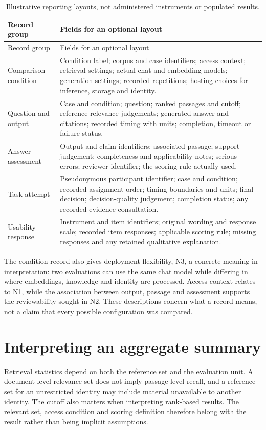 \begin{longtable}{@{}>{\raggedright\arraybackslash}p{}>{\raggedright\arraybackslash}p{}@{}}
\caption{Illustrative reporting layouts, not administered instruments or populated results.}\label{tab:optional-record-layouts}\\
\toprule
Record group & Fields for an optional layout \\
\midrule
\endfirsthead
\toprule
Record group & Fields for an optional layout \\
\midrule
\endhead
Comparison condition & Condition label; corpus and case identifiers; access context; retrieval settings; actual chat and embedding models; generation settings; recorded repetitions; hosting choices for inference, storage and identity. \\
Question and output & Case and condition; question; ranked passages and cutoff; reference relevance judgements; generated answer and citations; recorded timing with units; completion, timeout or failure status. \\
Answer assessment & Output and claim identifiers; associated passage; support judgement; completeness and applicability notes; serious errors; reviewer identifier; the scoring rule actually used. \\
Task attempt & Pseudonymous participant identifier; case and condition; recorded assignment order; timing boundaries and units; final decision; decision-quality judgement; completion status; any recorded evidence consultation. \\
Usability response & Instrument and item identifiers; original wording and response scale; recorded item responses; applicable scoring rule; missing responses and any retained qualitative explanation. \\
\bottomrule
\end{longtable}

The condition record also gives deployment flexibility, N3, a concrete meaning in interpretation: two evaluations can use the same chat model while differing in where embeddings, knowledge and identity are processed. Access context relates to N1, while the association between output, passage and assessment supports the reviewability sought in N2. These descriptions concern what a record means, not a claim that every possible configuration was compared.

\section{Interpreting an aggregate summary}
Retrieval statistics depend on both the reference set and the evaluation unit. A document-level relevance set does not imply passage-level recall, and a reference set for an unrestricted identity may include material unavailable to another identity. The cutoff also matters when interpreting rank-based results. The relevant set, access condition and scoring definition therefore belong with the result rather than being implicit assumptions.


